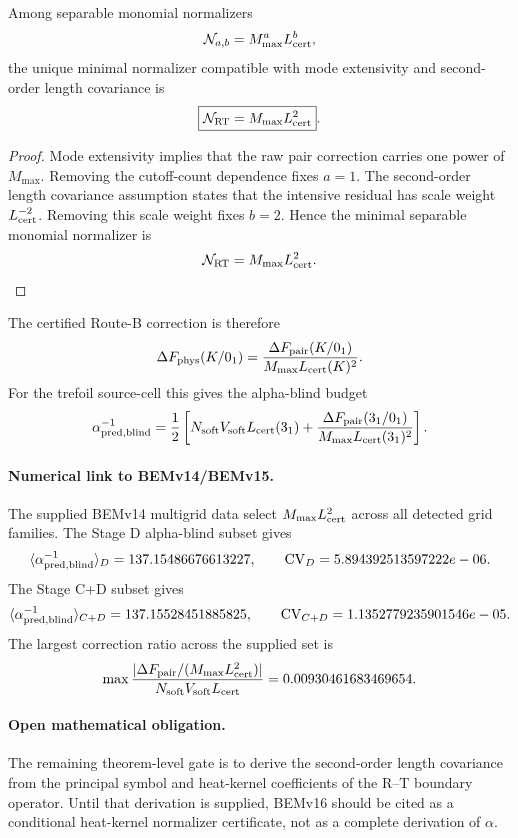 \begin{theorem}
Among separable monomial normalizers
\[
\mathcal N_{a,b}=M_{\max}^{a}L_{\rm cert}^{b},
\]
the unique minimal normalizer compatible with mode extensivity and
second-order length covariance is
\[
\boxed{\mathcal N_{\rm RT}=M_{\max}L_{\rm cert}^{2}}.
\]
\end{theorem}

\begin{proof}
Mode extensivity implies that the raw pair correction carries one power of
\(M_{\max}\).  Removing the cutoff-count dependence fixes \(a=1\).  The
second-order length covariance assumption states that the intensive residual
has scale weight \(L_{\rm cert}^{-2}\).  Removing this scale weight fixes
\(b=2\).  Hence the minimal separable monomial normalizer is
\[
\mathcal N_{\rm RT}=M_{\max}L_{\rm cert}^{2}.
\]
\end{proof}

The certified Route-B correction is therefore
\[
\Delta F_{\rm phys}(K/0_1)
=
\frac{\Delta F_{\rm pair}(K/0_1)}
{M_{\max}L_{\rm cert}(K)^2}.
\]
For the trefoil source-cell this gives the alpha-blind budget
\[
\alpha^{-1}_{\rm pred,blind}
=
\frac12
\left[
N_{\rm soft}V_{\rm soft}L_{\rm cert}(3_1)
+
\frac{\Delta F_{\rm pair}(3_1/0_1)}
{M_{\max}L_{\rm cert}(3_1)^2}
\right].
\]

\paragraph{Numerical link to BEMv14/BEMv15.}
The supplied BEMv14 multigrid data select \(M_{\max}L_{\rm cert}^{2}\) across
all detected grid families.  The Stage D alpha-blind subset gives
\[
\langle\alpha^{-1}_{\rm pred,blind}\rangle_D=137.15486676613227,
\qquad
{\rm CV}_D=5.894392513597222e-06.
\]
The Stage C+D subset gives
\[
\langle\alpha^{-1}_{\rm pred,blind}\rangle_{C+D}=137.15528451885825,
\qquad
{\rm CV}_{C+D}=1.1352779235901546e-05.
\]
The largest correction ratio across the supplied set is
\[
\max
\frac{|\Delta F_{\rm pair}/(M_{\max}L_{\rm cert}^{2})|}
{N_{\rm soft}V_{\rm soft}L_{\rm cert}}
=
0.00930461683469654.
\]

\paragraph{Open mathematical obligation.}
The remaining theorem-level gate is to derive the second-order length
covariance from the principal symbol and heat-kernel coefficients of the
R--T boundary operator.  Until that derivation is supplied, BEMv16 should be
cited as a conditional heat-kernel normalizer certificate, not as a complete
derivation of \(\alpha\).
